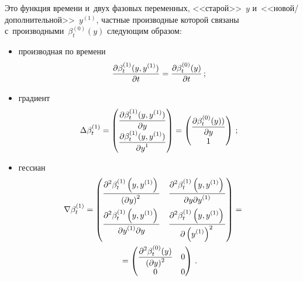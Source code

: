 \begin{multicols}{2}
     Это функция времени и~двух фазовых переменных, <<старой>>~$y$ 
     и~<<но\-вой/до\-пол\-ни\-тель\-ной>>~$y^{(1)}$, частные производные которой 
связаны с~производными~$\beta_t^{(0)}(y)$ следующим образом: 
\begin{itemize}
\item     производная по времени 
     $$
     \displaystyle\frac{\displaystyle \partial\beta_t^{(1)}(y,y^{(1)})\mathstrut}{\displaystyle \partial t\mathstrut} =\displaystyle\frac{\displaystyle \partial 
\beta_t^{(0)}(y)\mathstrut}{\displaystyle \partial t\mathstrut}\,;
     $$
\item     
     градиент
     $$
     \Delta \beta_t^{(1)}=\begin{pmatrix}
     \displaystyle\displaystyle\frac{\displaystyle \partial \beta_t^{(1)}(y,y^{(1)})\mathstrut}{\displaystyle \partial y\mathstrut}\\
     \displaystyle\displaystyle\frac{\displaystyle \partial \beta_t^{(1)} (y,y^{(1)})\mathstrut}{\displaystyle \partial y^1\mathstrut}
     \end{pmatrix}=\begin{pmatrix}
     \displaystyle\displaystyle\frac{\displaystyle \partial \beta_t^{(0)}(y))\mathstrut}{\displaystyle \partial y\mathstrut}\\
     1
     \end{pmatrix}\,;
     $$
\item     
     гессиан 
\begin{multline*}
     \hspace*{-11pt}     \nabla \beta_t^{(1)}= \begin{pmatrix}
     \displaystyle \fr{\partial^2\beta_t^{(1)}\left(y,y^{(1)}\right)}
     {\left(\partial y\right)^2} 
     &
     \displaystyle \fr{\partial^2\beta_t^{(1)}\left(y,y^{(1)}\right)}
     {\partial y \partial 
y^{(1)}}\\[12pt]
     \displaystyle \fr{\partial^2\beta_t^{(1)}\left(y,y^{(1)}\right)}{\partial y^{(1)}  
\partial y} & 
     \displaystyle \fr{\partial^2\beta_t^{(1)}\left(y,y^{(1)}\right)}
     {\partial \left( y^{(1)}\right)^2}
     \end{pmatrix}={}\\
     {}=\begin{pmatrix}
     \displaystyle \fr{\partial^2\beta_t^{(0)}(y)}{(\partial y)^2} &0\\
     0&0
     \end{pmatrix}\,.
   \end{multline*}
   \end{itemize}
     

\end{multicols}
